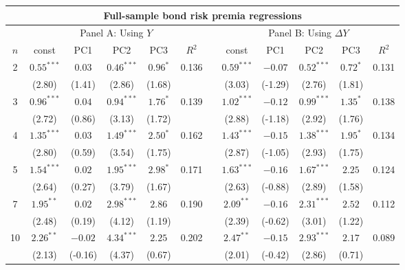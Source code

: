 \begin{tabular}{cccccclccccc}
	\hline
	\multicolumn{12}{c}{Full-sample bond risk premia regressions}\\\hline
	& \multicolumn{5}{c}{Panel A: Using $Y$} && \multicolumn{5}{c}{Panel B: Using $\Delta Y$}\\\cline{2-6}\cline{8-12}
$n$ & const  & PC1      & PC2       & PC3       & $R^{2}$ && const   & PC1     & PC2     & PC3    & $R^{2}$\\
\hline
2 & $0.55^{***}$ & $0.03$ & $0.46^{***}$ & $0.96^{*}$ & 0.136 &  & $0.59^{***}$ & $-0.07$ & $0.52^{***}$ & $0.72^{*}$ & 0.131 \\
 & (2.80) & (1.41) & (2.86) & (1.68) &  &  & (3.03) & (-1.29) & (2.76) & (1.81) &  \\
3 & $0.96^{***}$ & $0.04$ & $0.94^{***}$ & $1.76^{*}$ & 0.139 &  & $1.02^{***}$ & $-0.12$ & $0.99^{***}$ & $1.35^{*}$ & 0.138 \\
 & (2.72) & (0.86) & (3.13) & (1.72) &  &  & (2.88) & (-1.18) & (2.92) & (1.76) &  \\
4 & $1.35^{***}$ & $0.03$ & $1.49^{***}$ & $2.50^{*}$ & 0.162 &  & $1.43^{***}$ & $-0.15$ & $1.38^{***}$ & $1.95^{*}$ & 0.134 \\
 & (2.80) & (0.59) & (3.54) & (1.75) &  &  & (2.87) & (-1.05) & (2.93) & (1.75) &  \\
5 & $1.54^{***}$ & $0.02$ & $1.95^{***}$ & $2.98^{*}$ & 0.171 &  & $1.63^{***}$ & $-0.16$ & $1.67^{***}$ & $2.25$ & 0.124 \\
 & (2.64) & (0.27) & (3.79) & (1.67) &  &  & (2.63) & (-0.88) & (2.89) & (1.58) &  \\
7 & $1.95^{**}$ & $0.02$ & $2.98^{***}$ & $2.86$ & 0.190 &  & $2.09^{**}$ & $-0.16$ & $2.31^{***}$ & $2.52$ & 0.112 \\
 & (2.48) & (0.19) & (4.12) & (1.19) &  &  & (2.39) & (-0.62) & (3.01) & (1.22) &  \\
10 & $2.26^{**}$ & $-0.02$ & $4.34^{***}$ & $2.25$ & 0.202 &  & $2.47^{**}$ & $-0.15$ & $2.93^{***}$ & $2.17$ & 0.089 \\
 & (2.13) & (-0.16) & (4.37) & (0.67) &  &  & (2.01) & (-0.42) & (2.86) & (0.71) &  \\
\hline
    \end{tabular}
